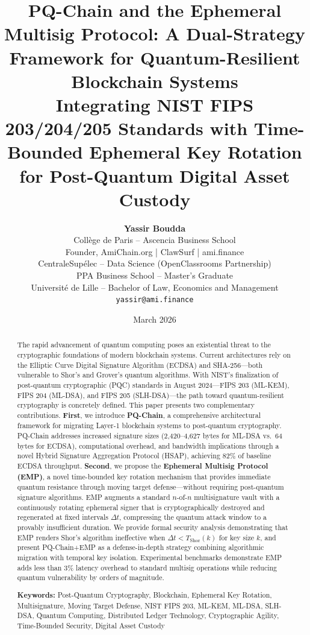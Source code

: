 \documentclass[12pt, a4paper, twocolumn]{article}
\title{%
  \vspace{-1cm}
  \LARGE\textbf{PQ-Chain and the Ephemeral Multisig Protocol: A Dual-Strategy Framework for Quantum-Resilient Blockchain Systems}\\[0.5em]
  \large Integrating NIST FIPS 203/204/205 Standards with Time-Bounded Ephemeral Key Rotation for Post-Quantum Digital Asset Custody
}
\author{%
  \textbf{Yassir Boudda}\\[0.3em]
  \small Coll\`ege de Paris -- Ascencia Business School\\
  \small Founder, AmiChain.org | ClawSurf | ami.finance\\
  \small CentraleSup\'elec -- Data Science (OpenClassrooms Partnership)\\
  \small PPA Business School -- Master's Graduate\\
  \small Universit\'e de Lille -- Bachelor of Law, Economics and Management\\
  \small \texttt{yassir@ami.finance}
}
\date{March 2026}
\begin{document}
\maketitle

\begin{abstract}
\noindent
The rapid advancement of quantum computing poses an existential threat to the cryptographic foundations of modern blockchain systems. Current architectures rely on the Elliptic Curve Digital Signature Algorithm (ECDSA) and SHA-256---both vulnerable to Shor's and Grover's quantum algorithms. With NIST's finalization of post-quantum cryptographic (PQC) standards in August 2024---FIPS 203 (ML-KEM), FIPS 204 (ML-DSA), and FIPS 205 (SLH-DSA)---the path toward quantum-resilient cryptography is concretely defined. This paper presents two complementary contributions. \textbf{First}, we introduce \textbf{PQ-Chain}, a comprehensive architectural framework for migrating Layer-1 blockchain systems to post-quantum cryptography. PQ-Chain addresses increased signature sizes (2,420--4,627 bytes for ML-DSA vs.\ 64 bytes for ECDSA), computational overhead, and bandwidth implications through a novel Hybrid Signature Aggregation Protocol (HSAP), achieving 82\% of baseline ECDSA throughput. \textbf{Second}, we propose the \textbf{Ephemeral Multisig Protocol (EMP)}, a novel time-bounded key rotation mechanism that provides immediate quantum resistance through moving target defense---without requiring post-quantum signature algorithms. EMP augments a standard $n$-of-$n$ multisignature vault with a continuously rotating ephemeral signer that is cryptographically destroyed and regenerated at fixed intervals $\Delta t$, compressing the quantum attack window to a provably insufficient duration. We provide formal security analysis demonstrating that EMP renders Shor's algorithm ineffective when $\Delta t < T_{\text{Shor}}(k)$ for key size $k$, and present PQ-Chain+EMP as a defense-in-depth strategy combining algorithmic migration with temporal key isolation. Experimental benchmarks demonstrate EMP adds less than 3\% latency overhead to standard multisig operations while reducing quantum vulnerability by orders of magnitude.

\medskip
\noindent\textbf{Keywords:} Post-Quantum Cryptography, Blockchain, Ephemeral Key Rotation, Multisignature, Moving Target Defense, NIST FIPS 203, ML-KEM, ML-DSA, SLH-DSA, Quantum Computing, Distributed Ledger Technology, Cryptographic Agility, Time-Bounded Security, Digital Asset Custody
\end{abstract}
\end{document}
